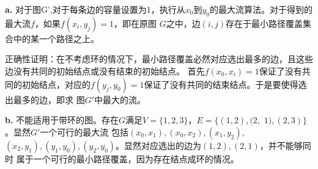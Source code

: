 \begin{solution}    

    \textbf{a.} 对于图G',对于每条边的容量设置为1，执行从$x_0$到$y_0$的最大流算法。对于得到的最大流$f$，如果$f(x_i,y_j)=1$，即在原图
    $G$之中，边$(i,j)$存在于最小路径覆盖集合中的某一个路径之上。

    正确性证明：在不考虑环的情况下，最小路径覆盖必然对应选出最多的边，且这些边没有共同的初始结点或没有结束的初始结点。
    首先$f(x_0,x_i)=1$保证了没有共同的初始结点，对应的$f(y_j,y_0)=1$保证了没有共同的结束结点。于是要使得选出最多的边，即求
    图$G'$中最大的流。

    \textbf{b.} 不能适用于带环的图。存在$G$满足$V=\{1,2,3\}$，$E=\{(1,2),(2,$ $1),(2,3)\}$。显然$G'$一个可行的最大流
    包括$(x_0,x_1),(x_0,x_2),(x_1,y_2),$ $(x_2,y_1),(y_1,y_0),(y_2,y_0)$。显然对应选出的边为$(1,2),(2,1)$，并不能够同时
    属于一个可行的最小路径覆盖，因为存在结点成环的情况。

\end{solution}